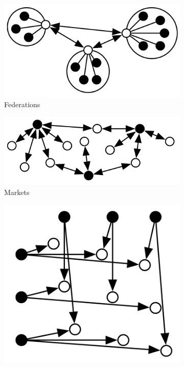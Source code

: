 \begin{figure}
\begin{subfigure}[h]{0.3\linewidth}
    \end{subfigure}
    \begin{subfigure}[h]{0.3\linewidth}
        \includegraphics[width=\textwidth]{images/orgs/org-federations.png}
        \caption{Federations}
        \label{fig:federations}
    \end{subfigure}
    \begin{subfigure}[h]{0.3\linewidth}
        \includegraphics[width=\textwidth]{images/orgs/org-markets.png}
        \caption{Markets}
        \label{fig:markets}
    \end{subfigure}
    \begin{subfigure}[h]{0.3\linewidth}
        \includegraphics[width=\textwidth]{images/orgs/org-matrix.png}

\end{subfigure}
\end{figure}
